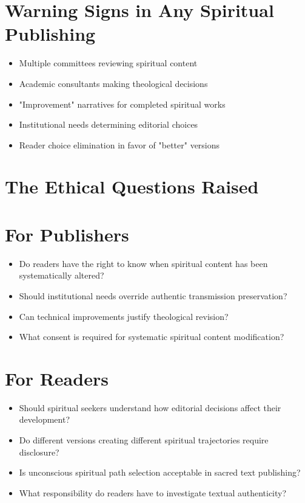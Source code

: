 \documentclass[11pt,twoside]{book}
\begin{document}
\section*{Warning Signs in Any Spiritual Publishing}
\label{sec:org6d827ec}
\begin{itemize}
\item Multiple committees reviewing spiritual content
\item Academic consultants making theological decisions
\item "Improvement" narratives for completed spiritual works
\item Institutional needs determining editorial choices
\item Reader choice elimination in favor of "better" versions
\end{itemize}
\section*{The Ethical Questions Raised}
\label{sec:orgdb1544b}

\section*{For Publishers}
\label{sec:org38539a8}
\begin{itemize}
\item Do readers have the right to know when spiritual content has been systematically altered?
\item Should institutional needs override authentic transmission preservation?
\item Can technical improvements justify theological revision?
\item What consent is required for systematic spiritual content modification?
\end{itemize}
\section*{For Readers}
\label{sec:org45e406c}
\begin{itemize}
\item Should spiritual seekers understand how editorial decisions affect their development?
\item Do different versions creating different spiritual trajectories require disclosure?
\item Is unconscious spiritual path selection acceptable in sacred text publishing?
\item What responsibility do readers have to investigate textual authenticity?
\end{itemize}
\end{document}
